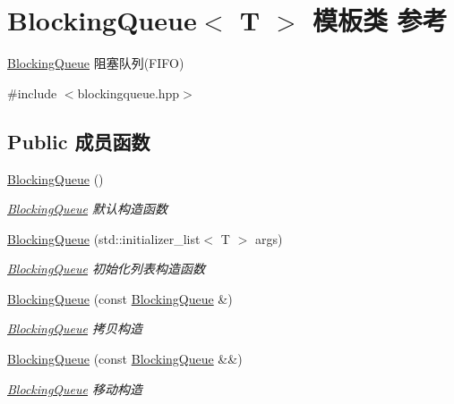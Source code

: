 \hypertarget{classBlockingQueue}{}\section{Blocking\+Queue$<$ T $>$ 模板类 参考}
\label{classBlockingQueue}


\hyperlink{classBlockingQueue}{Blocking\+Queue} 阻塞队列(\+F\+I\+F\+O)  




{\ttfamily \#include $<$blockingqueue.\+hpp$>$}

\subsection*{Public 成员函数}
\begin{DoxyCompactItemize}
\item 
\mbox{\label{classBlockingQueue_a42f821a61ba22ba27e6d1a434ab27eb2}} 
\hyperlink{classBlockingQueue_a42f821a61ba22ba27e6d1a434ab27eb2}{Blocking\+Queue} ()
\begin{DoxyCompactList}\small\item\em \hyperlink{classBlockingQueue}{Blocking\+Queue} 默认构造函数 \end{DoxyCompactList}\item 
\hyperlink{classBlockingQueue_a4d1bbabd0a1212ab77b3a24614b6b0c1}{Blocking\+Queue} (std\+::initializer\+\_\+list$<$ T $>$ args)
\begin{DoxyCompactList}\small\item\em \hyperlink{classBlockingQueue}{Blocking\+Queue} 初始化列表构造函数 \end{DoxyCompactList}\item 
\hyperlink{classBlockingQueue_a2f2b1e4d887d77a81fddabd44c5cdbfd}{Blocking\+Queue} (const \hyperlink{classBlockingQueue}{Blocking\+Queue} \&)
\begin{DoxyCompactList}\small\item\em \hyperlink{classBlockingQueue}{Blocking\+Queue} 拷贝构造 \end{DoxyCompactList}\item 
\hyperlink{classBlockingQueue_ab7dbc308989dda7bef2f884a2703c806}{Blocking\+Queue} (const \hyperlink{classBlockingQueue}{Blocking\+Queue} \&\&)
\begin{DoxyCompactList}\small\item\em \hyperlink{classBlockingQueue}{Blocking\+Queue} 移动构造 \end{DoxyCompactList}\item 

\end{DoxyCompactItemize}
